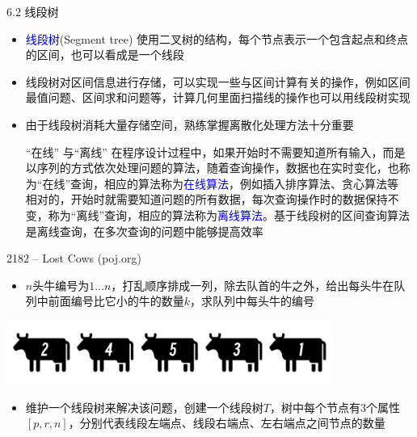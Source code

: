 \begin{frame}{6.2 线段树}
    \begin{itemize}
        \item \textcolor{blue}{线段树}(Segment tree) 使用二叉树的结构，每个节点表示一个包含起点和终点的区间，也可以看成是一个线段
        \vfill
        \item 线段树对区间信息进行存储，可以实现一些与区间计算有关的操作，例如区间最值问题、区间求和问题等，计算几何里面扫描线的操作也可以用线段树实现
        \vfill
        \item 由于线段树消耗大量存储空间，熟练掌握离散化处理方法十分重要
        \begin{block}{“在线” 与“离线”}
            \scriptsize{
                \quad 在程序设计过程中，如果开始时不需要知道所有输入，而是以序列的方式依次处理问题的算法，随着查询操作，数据也在实时变化，也称为“在线”查询，相应的算法称为\textcolor{blue}{在线算法}，例如插入排序算法、贪心算法等\\
                \quad 相对的，开始时就需要知道问题的所有数据，每次查询操作时的数据保持不变，称为“离线”查询，相应的算法称为\textcolor{blue}{离线算法}。基于线段树的区间查询算法是离线查询，在多次查询的问题中能够提高效率}
        \end{block}
    \end{itemize}
\end{frame}
\begin{frame}{2182 -- Lost Cows (poj.org)}
    \begin{itemize}
        \item  $n$头牛编号为$1…n$，打乱顺序排成一列，除去队首的牛之外，给出每头牛在队列中前面编号比它小的牛的数量$k$，求队列中每头牛的编号
    \end{itemize}
    \includegraphics[width=0.8\textwidth,center]{fig/6-3.png}
    \begin{itemize}
        \item  维护一个线段树来解决该问题，创建一个线段树$T$，树中每个节点有3个属性$[p,r,n]$，分别代表线段左端点、线段右端点、左右端点之间节点的数量
    \end{itemize}
\end{frame}
